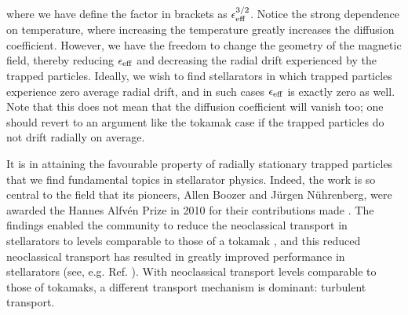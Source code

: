 where we have define the factor in brackets as $\epsilon_{\rm eff}^{3/2}$. Notice the strong dependence on temperature, where increasing the temperature greatly increases the diffusion coefficient. However, we have the freedom to change the geometry of the magnetic field, thereby reducing $\epsilon_{\rm eff}$ and decreasing the radial drift experienced by the trapped particles. Ideally, we wish to find stellarators in which trapped particles experience zero average radial drift, and in such cases $\epsilon_{\rm eff}$ is exactly zero as well. Note that this does not mean that the diffusion coefficient will vanish too; one should revert to an argument like the tokamak case if the trapped particles do not drift radially on average.
\par 
It is in attaining the favourable property of radially stationary trapped particles that we find fundamental topics in stellarator physics. Indeed, the work is so central to the field that its pioneers, Allen Boozer and J\"urgen N\"uhrenberg, were awarded the Hannes Alfv\'en Prize in 2010 for their contributions made \cite{mendoncca201037th}. The findings enabled the community to reduce the neoclassical transport in stellarators to levels comparable to those of a tokamak \cite{landreman2022magnetic,paul2022energetic,goodman2022constructing}, and this reduced neoclassical transport has resulted in greatly improved performance in stellarators (see, e.g. Ref. \cite{beidler2021demonstration}). With neoclassical transport levels comparable to those of tokamaks, a different transport mechanism is dominant: turbulent transport.

